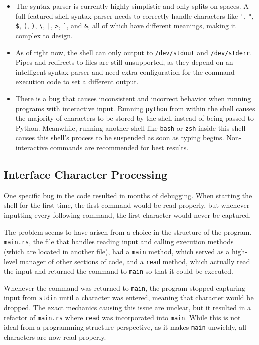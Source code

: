 \documentclass[12pt,twoside]{report} %
\begin{document}
    \begin{itemize}[noitemsep,topsep=0pt]
        \item The syntax parser is currently highly simplistic and only splits on spaces. A full-featured shell syntax parser needs to correctly handle characters like \verb|'|, \verb|"|, \verb|$|, \verb|(|, \verb|)|, \verb|\|, \verb=|=, \verb|>|, \verb|`|, and \verb|&|, all of which have different meanings, making it complex to design.
        \item As of right now, the shell can only output to \verb|/dev/stdout| and \verb|/dev/stderr|. Pipes and redirects to files are still unsupported, as they depend on an intelligent syntax parser and need extra configuration for the command-execution code to set a different output.
        \item There is a bug that causes inconsistent and incorrect behavior when running programs with interactive input. Running \verb|python| from within the shell causes the majority of characters to be stored by the shell instead of being passed to Python. Meanwhile, running another shell like \verb|bash| or \verb|zsh| inside this shell causes this shell's process to be suspended as soon as typing begins. Non-interactive commands are recommended for best results.
    \end{itemize}

	\subsection{Interface Character Processing} \label{sec:interface-character-processing}
	One specific bug in the code resulted in months of debugging. When starting the shell for the first time, the first command would be read properly, but whenever inputting every following command, the first character would never be captured.
	
	The problem seems to have arisen from a choice in the structure of the program. \verb|main.rs|, the file that handles reading input and calling execution methods (which are located in another file), had a \verb|main| method, which served as a high-level manager of other sections of code, and a \verb|read| method, which actually read the input and returned the command to \verb|main| so that it could be executed.
	
	Whenever the command was returned to \verb|main|, the program stopped capturing input from \verb|stdin| until a character was entered, meaning that character would be dropped. The exact mechanics causing this issue are unclear, but it resulted in a refactor of \verb|main.rs| where \verb|read| was incorporated into \verb|main|. While this is not ideal from a programming structure perspective, as it makes \verb|main| unwieldy, all characters are now read properly.
\end{document}
